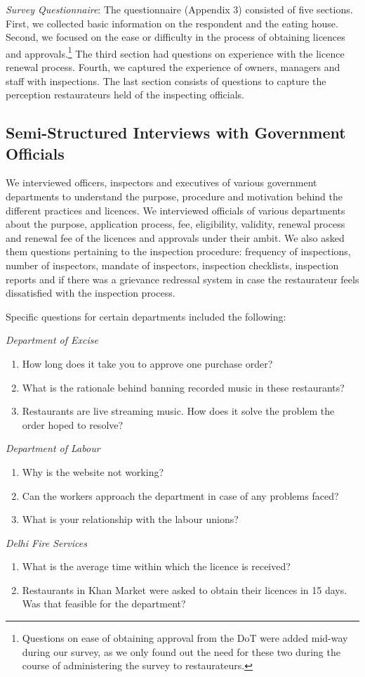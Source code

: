 \documentclass[a4paper, 12pt]{article}
\begin{document}
		\textit{Survey Questionnaire}: The questionnaire (Appendix 3) consisted of five sections. First, we collected basic information on the respondent and the eating house. Second, we focused on the ease or difficulty in the process of obtaining licences and 
approvals.\footnote{Questions on ease of obtaining approval from the DoT were added mid-way during our survey, as we only found out the need for these two during the course of administering the survey to restaurateurs.} The third section had questions on 
experience with the licence renewal process. Fourth, we captured the experience of owners, managers and staff with inspections. The last section consists of questions to capture the perception restaurateurs held of the inspecting officials.

		\subsection*{Semi-Structured Interviews with Government Officials}
		We interviewed officers, inspectors and executives of various government departments to understand the purpose, procedure and motivation behind the different practices and licences. We interviewed officials of various departments about the purpose, 
application process, fee, eligibility, validity, renewal process and renewal fee of the licences and approvals under their ambit. We also asked them questions pertaining to the inspection procedure: frequency of inspections, number of inspectors, mandate of 
inspectors, inspection checklists, inspection reports and if there was a grievance redressal system in case the restaurateur feels dissatisfied with the inspection process.
		
		Specific questions for certain departments included the following:
		
		\textit {Department of Excise}
			\begin {enumerate}[-,nosep]
			\item How long does it take you to approve one purchase order? 
			\item What is the rationale behind banning recorded music in these restaurants?
			\item Restaurants are live streaming music. How does it solve the problem the order hoped to resolve?
			\end {enumerate}
		\textit {Department of Labour}
			\begin {enumerate}[-,nosep]
			\item Why is the website not working? 
			\item Can the workers approach the department in case of any problems faced?
			\item What is your relationship with the labour unions?
			\end {enumerate}
		\textit {Delhi Fire Services}
		\begin {enumerate}[-,nosep]
		\item What is the average time within which the licence is received?
		\item Restaurants in Khan Market were asked to obtain their licences in 15 days. Was that feasible for the department?
		\end {enumerate}
\end{document}

